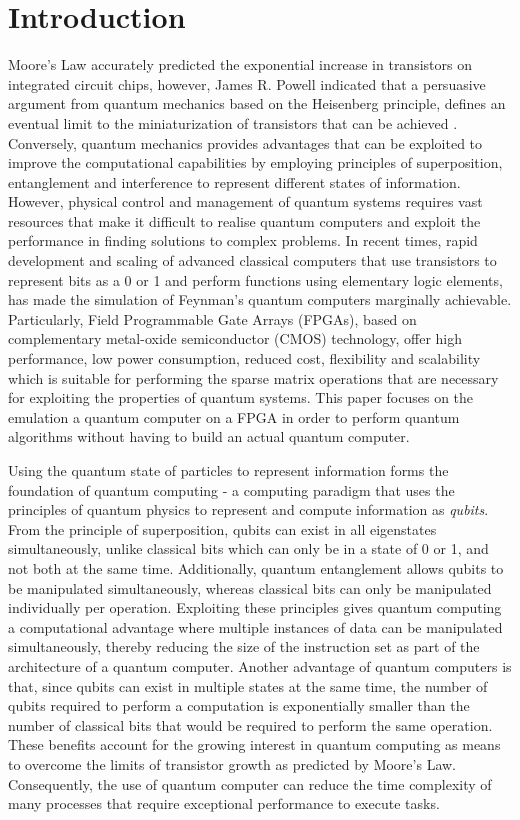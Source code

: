 \chapter{\label{ch:intro} Introduction}

Moore's Law accurately predicted the exponential increase in transistors on integrated circuit chips, however, James R. Powell indicated that a persuasive argument from quantum mechanics based on the Heisenberg principle, defines an eventual limit to the miniaturization of transistors that can be achieved \cite{powell2008}. Conversely, quantum mechanics provides advantages that can be exploited to improve the computational capabilities by employing principles of superposition, entanglement and interference to represent different states of information. However, physical control and management of quantum systems requires vast resources that make it difficult to realise quantum computers and exploit the performance in finding solutions to complex problems. In recent times, rapid development and scaling of advanced classical computers that use transistors to represent bits as a 0 or 1 and perform functions using elementary logic elements, has made the simulation of Feynman's quantum computers marginally achievable. Particularly, Field Programmable Gate Arrays (FPGAs), based on complementary metal-oxide semiconductor (CMOS) technology, offer high performance, low power consumption, reduced cost, flexibility and scalability which is suitable for performing the sparse matrix operations that are necessary for exploiting the properties of quantum systems. This paper focuses on the emulation a quantum computer on a FPGA in order to perform quantum algorithms without having to build an actual quantum computer. 

Using the quantum state of particles to represent information forms the foundation of quantum computing - a computing paradigm that uses the principles of quantum physics to represent and compute information as \textit{qubits}. From the principle of superposition, qubits can exist in all eigenstates simultaneously, unlike classical bits which can only be in a state of 0 or 1, and not both at the same time. Additionally, quantum entanglement allows qubits to be manipulated simultaneously, whereas classical bits can only be manipulated individually per operation. Exploiting these principles gives quantum computing a computational advantage where multiple instances of data can be manipulated simultaneously, thereby reducing the size of the instruction set as part of the architecture of a quantum computer. Another advantage of quantum computers is that, since qubits can exist in multiple states at the same time, the number of qubits required to perform a computation is exponentially smaller than the number of classical bits that would be required to perform the same operation. These benefits account for the growing interest in quantum computing as means to overcome the limits of transistor growth as predicted by Moore's Law. Consequently, the use of quantum computer can reduce the time complexity of many processes that require exceptional performance to execute tasks. 

